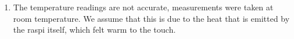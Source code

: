 \documentclass{article}
\begin{document}
\begin{enumerate}[label={\arabic*.}]
\begin{enumerate}
        \item The temperature readings are not accurate, measurements were taken at room temperature. We assume that this is due to the heat that is emitted by the raspi itself, which felt warm to the touch.
    \end{enumerate}
\end{enumerate}
\end{document}
